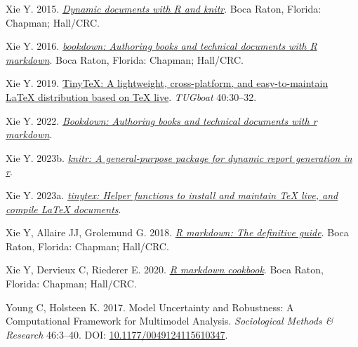 \documentclass[10pt,a4paper]{article}
\newlength{\cslhangindent}
\newlength{\cslentryspacingunit} %
\newenvironment{CSLReferences}[2] %
 {%
  \setlength{\parindent}{0pt}
  \ifodd #1
  \let\oldpar\par
  \def\par{\hangindent=\cslhangindent\oldpar}
  \fi
  \setlength{\parskip}{#2\cslentryspacingunit}
 }%
 {}
\begin{document}
\begin{CSLReferences}{1}{0}
\leavevmode{}%
Xie Y. 2015. \emph{\href{https://yihui.org/knitr/}{Dynamic documents with {R} and knitr}}. Boca Raton, Florida: Chapman; Hall/CRC.

\leavevmode{}%
Xie Y. 2016. \emph{\href{https://bookdown.org/yihui/bookdown}{{bookdown}: Authoring books and technical documents with {R} markdown}}. Boca Raton, Florida: Chapman; Hall/CRC.

\leavevmode{}%
Xie Y. 2019. \href{https://tug.org/TUGboat/Contents/contents40-1.html}{{TinyTeX}: A lightweight, cross-platform, and easy-to-maintain LaTeX distribution based on TeX live}. \emph{TUGboat} 40:30--32.

\leavevmode{}%
Xie Y. 2022. \emph{\href{https://CRAN.R-project.org/package=bookdown}{Bookdown: Authoring books and technical documents with r markdown}}.

\leavevmode{}%
Xie Y. 2023b. \emph{\href{https://yihui.org/knitr/}{{knitr}: A general-purpose package for dynamic report generation in r}}.

\leavevmode{}%
Xie Y. 2023a. \emph{\href{https://github.com/rstudio/tinytex}{{tinytex}: Helper functions to install and maintain TeX live, and compile LaTeX documents}}.

\leavevmode{}%
Xie Y, Allaire JJ, Grolemund G. 2018. \emph{\href{https://bookdown.org/yihui/rmarkdown}{R markdown: The definitive guide}}. Boca Raton, Florida: Chapman; Hall/CRC.

\leavevmode{}%
Xie Y, Dervieux C, Riederer E. 2020. \emph{\href{https://bookdown.org/yihui/rmarkdown-cookbook}{R markdown cookbook}}. Boca Raton, Florida: Chapman; Hall/CRC.

\leavevmode{}%
Young C, Holsteen K. 2017. Model {Uncertainty} and {Robustness}: {A} {Computational} {Framework} for {Multimodel} {Analysis}. \emph{Sociological Methods \& Research} 46:3--40. DOI: \href{https://doi.org/10.1177/0049124115610347}{10.1177/0049124115610347}.

\end{CSLReferences}
\end{document}
